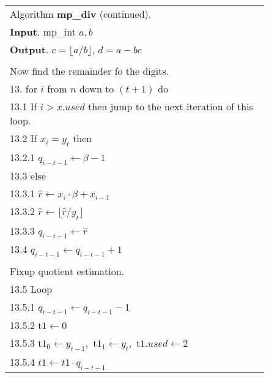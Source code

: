 \documentclass[b5paper]{book}
\begin{document}
\newpage\begin{figure}[!here]
\begin{small}
\begin{center}
\begin{tabular}{l}
\hline Algorithm \textbf{mp\_div} (continued). \\
\textbf{Input}.   mp\_int $a, b$ \\
\textbf{Output}.  $c = \lfloor a/b \rfloor$, $d = a - bc$ \\
\hline \\
Now find the remainder fo the digits. \\
13.  for $i$ from $n$ down to $(t + 1)$ do \\
\hspace{3mm}13.1  If $i > x.used$ then jump to the next iteration of this loop. \\
\hspace{3mm}13.2  If $x_{i} = y_{t}$ then \\
\hspace{6mm}13.2.1  $q_{i - t - 1} \leftarrow \beta - 1$ \\
\hspace{3mm}13.3  else \\
\hspace{6mm}13.3.1  $\hat r \leftarrow x_{i} \cdot \beta + x_{i - 1}$ \\
\hspace{6mm}13.3.2  $\hat r \leftarrow \lfloor \hat r / y_{t} \rfloor$ \\
\hspace{6mm}13.3.3  $q_{i - t - 1} \leftarrow \hat r$ \\
\hspace{3mm}13.4  $q_{i - t - 1} \leftarrow q_{i - t - 1} + 1$ \\
\\
Fixup quotient estimation. \\
\hspace{3mm}13.5  Loop \\
\hspace{6mm}13.5.1  $q_{i - t - 1} \leftarrow q_{i - t - 1} - 1$ \\
\hspace{6mm}13.5.2  t$1 \leftarrow 0$ \\
\hspace{6mm}13.5.3  t$1_0 \leftarrow y_{t - 1}, $ t$1_1 \leftarrow y_t,$ t$1.used \leftarrow 2$ \\
\hspace{6mm}13.5.4  $t1 \leftarrow t1 \cdot q_{i - t - 1}$ \\

\end{tabular}
\end{center}
\end{small}
\end{figure}
\end{document}
